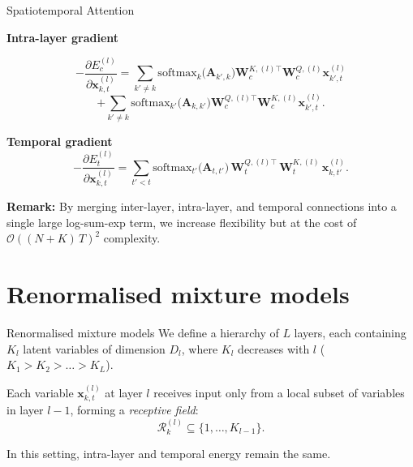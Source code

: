 \documentclass{beamer}
\begin{document}
\begin{frame}{Spatiotemporal Attention}

    \textbf{Intra-layer gradient}

    \[
    -\frac{\partial E_{c}^{(l)}}{\partial \bm{x}_{k,t}^{(l)}}
    =
    \sum_{k'\neq k}
    \mathrm{softmax}_{k}\bigl(\bm{A}_{k',k}\bigr)
    \bm{W}_{c}^{K,(l)\top} \bm{W}_{c}^{Q,(l)} \bm{x}_{k',t}^{(l)}
\]
\[
    +
    \sum_{k'\neq k}
    \mathrm{softmax}_{k'}\bigl(\bm{A}_{k, k'}\bigr)
    \bm{W}_{c}^{Q,(l)\top} \bm{W}_{c}^{K,(l)} \bm{x}_{k',t}^{(l)}.
\]

\textbf{Temporal gradient}
\[
-\frac{\partial E_{t}^{(l)}}{\partial \bm{x}_{k,t}^{(l)}}
=
\sum_{t'<t}
\mathrm{softmax}_{t'}\bigl(\bm{A}_{t,t'}\bigr)\,
\bm{W}_{t}^{Q,(l)\top}\,\bm{W}_{t}^{K,(l)}\,\bm{x}_{k,t'}^{(l)}.
\]

\textbf{Remark:} 
By merging inter-layer, intra-layer, and temporal connections into a single large log-sum-exp term, we increase flexibility but at the cost of \(\mathcal{O}((N + K)\,T)^2\) complexity.

\end{frame}

\section{Renormalised mixture models}


\begin{frame}{Renormalised mixture models}
    We define a hierarchy of \(L\) layers, each containing \(K_l\) latent variables of dimension \(D_l\), where \(K_l\) decreases with \(l\) (\(K_1 > K_2 > \dots > K_L\)). 

    \bigskip

    Each variable \(\bm{x}_{k,t}^{(l)}\) at layer \(l\) receives input only from a local subset of variables in layer \(l-1\), forming a \emph{receptive field}:
    \[
    \mathcal{R}_{k}^{(l)} \subseteq \{1, \dots, K_{l-1}\}.
    \]

    In this setting, intra-layer and temporal energy remain the same.

\end{frame}
\end{document}
